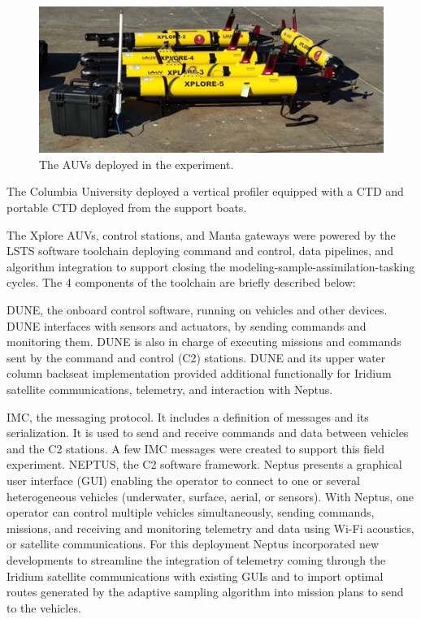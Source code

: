 \begin{figure}
    \centering
    \includegraphics[width=.7\linewidth]{fig/lauvs.png}
    \caption{The AUVs deployed in the experiment.}
    \label{fig:lauvs}
\end{figure}


The Columbia University deployed a vertical profiler equipped with a CTD
and portable CTD deployed from the support boats.

The Xplore AUVs, control stations, and Manta gateways were powered by
the LSTS software toolchain \cite{pinto2013lsts} deploying command and
control, data pipelines, and algorithm integration to support closing
the modeling-sample-assimilation-tasking cycles. The 4 components of the
toolchain are briefly described below:

DUNE, the onboard control software, running on vehicles and other
devices. DUNE interfaces with sensors and actuators, by sending commands
and monitoring them. DUNE is also in charge of executing missions and
commands sent by the command and control (C2) stations. DUNE and its
upper water column backseat implementation provided additional
functionally for Iridium satellite communications, telemetry, and
interaction with Neptus.

IMC, the messaging protocol. It includes a definition of messages and
its serialization. It is used to send and receive commands and data
between vehicles and the C2 stations. A few IMC messages were created to
support this field experiment. NEPTUS, the C2 software framework. Neptus
presents a graphical user interface (GUI) enabling the operator to
connect to one or several heterogeneous vehicles (underwater, surface,
aerial, or sensors). With Neptus, one operator can control multiple
vehicles simultaneously, sending commands, missions, and receiving and
monitoring telemetry and data using Wi-Fi acoustics, or satellite
communications. For this deployment Neptus incorporated new developments
to streamline the integration of telemetry coming through the Iridium
satellite communications with existing GUIs and to import optimal routes
generated by the adaptive sampling algorithm into mission plans to send
to the vehicles.

